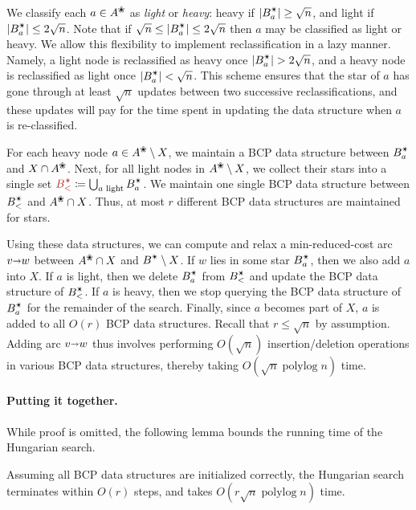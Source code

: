 \documentclass[11pt,twoside]{article}
\def\polylog{\mathop{\mathrm{polylog}}}
\def\abs#1{\mathopen| #1 \mathclose|}		%
\def\arcto{\mathord\shortrightarrow}
\def\arc#1#2{#1\arcto#2}
\def\alive#1{{#1}^\text{\ding{96}}}
\def\star{\text{\ding{84}}}
\theoremstyle{plain}
\numberwithin{figure}{section}
\renewcommand{\subparagraph}{\paragraph}
\def\EMPH#1{\textcolor{BrickRed}{{\emph{#1}}}}
\begin{document}
We classify each $a \in \alive{A}$ as \EMPH{light} or \EMPH{heavy}:
heavy if $\abs{B_a^\star} \geq \sqrt{n}$,
and light if $\abs{B_a^\star} \leq 2\sqrt{n}$.
Note that if $\sqrt{n} \leq \abs{B_a^\star} \leq 2\sqrt{n}$ then $a$ may be classified
as light or heavy.
We allow this flexibility to implement reclassification in a lazy manner.
Namely, a light node is reclassified as heavy once $\abs{B_a^\star} > 2\sqrt{n}$,
and a heavy node is reclassified as light once $\abs{B_a^\star} < \sqrt{n}$.
This scheme ensures that the star of $a$ has gone through at least $\sqrt{n}$
updates between two successive reclassifications,
and these updates will pay for the time spent in updating the data structure
when $a$ is re-classified.

For each heavy node $a \in \alive{A} \setminus X$, we maintain a BCP data
structure between $B_a^\star$ and $X \cap \alive{A}$.
Next, for all light nodes in $\alive{A} \setminus X$, we collect their stars into
a single set $\EMPH{$B_<^\star$} \coloneqq \bigcup_{\text{$a$ light}} B_a^\star$.
We maintain one single BCP data structure between $B_<^\star$ and $\alive{A} \cap X$.
Thus, at most $r$ different BCP data structures are maintained for stars.

Using these data structures, we can compute and relax a min-reduced-cost arc $\arc vw$ between
$\alive{A} \cap X$ and $B^\star \setminus X$.
If $w$ lies in some star $B_a^\star$, then we also add $a$ into $X$.
If $a$ is light, then we delete $B_a^\star$ from $B_<^\star$ and update the BCP data structure of $B_<^\star$.
If $a$ is heavy, then we stop querying the BCP data structure of $B_a^\star$ for the
remainder of the search.
Finally, since $a$ becomes part of $X$, $a$ is added to all $O(r)$ BCP data structures.
%
Recall that $r \leq \sqrt{n}$ by assumption.
Adding arc $\arc vw$ thus involves performing $O(\sqrt{n})$
insertion/deletion operations in various BCP data structures, thereby taking
$O(\sqrt{n}\polylog n)$ time.

\subparagraph{Putting it together.}
While proof is omitted, the following lemma bounds the running time of the
Hungarian search.

\begin{lemma}
Assuming all BCP data structures are initialized correctly, the Hungarian search
terminates within $O(r)$ steps, and takes $O(r\sqrt{n}\polylog n)$ time.
\end{lemma}
\end{document}
